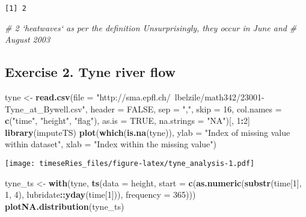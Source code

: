 \documentclass[]{book}
\newenvironment{Shaded}{\begin{snugshade}}{\end{snugshade}}
\newcommand{\KeywordTok}[1]{\textcolor[rgb]{0.13,0.29,0.53}{\textbf{#1}}}
\newcommand{\DataTypeTok}[1]{\textcolor[rgb]{0.13,0.29,0.53}{#1}}
\newcommand{\DecValTok}[1]{\textcolor[rgb]{0.00,0.00,0.81}{#1}}
\newcommand{\StringTok}[1]{\textcolor[rgb]{0.31,0.60,0.02}{#1}}
\newcommand{\CommentTok}[1]{\textcolor[rgb]{0.56,0.35,0.01}{\textit{#1}}}
\newcommand{\OtherTok}[1]{\textcolor[rgb]{0.56,0.35,0.01}{#1}}
\newcommand{\OperatorTok}[1]{\textcolor[rgb]{0.81,0.36,0.00}{\textbf{#1}}}
\newcommand{\NormalTok}[1]{#1}
\begin{document}
\begin{verbatim}
[1] 2
\end{verbatim}

\begin{Shaded}
\begin{Highlighting}[]
\CommentTok{# 2 `heatwaves` as per the definition Unsurprisingly, they occur in June and}
\CommentTok{# August 2003}
\end{Highlighting}
\end{Shaded}

\subsection{Exercise 2. Tyne river
flow}\label{exercise-2.-tyne-river-flow-1}

\begin{Shaded}
\begin{Highlighting}[]
\NormalTok{tyne <-}\StringTok{ }\KeywordTok{read.csv}\NormalTok{(}\DataTypeTok{file =} \StringTok{"http://sma.epfl.ch/~lbelzile/math342/23001-Tyne_at_Bywell.csv"}\NormalTok{, }
    \DataTypeTok{header =} \OtherTok{FALSE}\NormalTok{, }\DataTypeTok{sep =} \StringTok{","}\NormalTok{, }\DataTypeTok{skip =} \DecValTok{16}\NormalTok{, }\DataTypeTok{col.names =} \KeywordTok{c}\NormalTok{(}\StringTok{"time"}\NormalTok{, }\StringTok{"height"}\NormalTok{, }\StringTok{"flag"}\NormalTok{), }
    \DataTypeTok{as.is =} \OtherTok{TRUE}\NormalTok{, }\DataTypeTok{na.strings =} \StringTok{"NA"}\NormalTok{)[, }\DecValTok{1}\OperatorTok{:}\DecValTok{2}\NormalTok{]}
\KeywordTok{library}\NormalTok{(imputeTS)}
\KeywordTok{plot}\NormalTok{(}\KeywordTok{which}\NormalTok{(}\KeywordTok{is.na}\NormalTok{(tyne)), }\DataTypeTok{ylab =} \StringTok{"Index of missing value within dataset"}\NormalTok{, }\DataTypeTok{xlab =} \StringTok{"Index within the missing value"}\NormalTok{)}
\end{Highlighting}
\end{Shaded}

\texttt{[image: timeseRies\_files/figure-latex/tyne\_analysis-1.pdf]}

\begin{Shaded}
\begin{Highlighting}[]
\NormalTok{tyne_ts <-}\StringTok{ }\KeywordTok{with}\NormalTok{(tyne, }\KeywordTok{ts}\NormalTok{(}\DataTypeTok{data =}\NormalTok{ height, }\DataTypeTok{start =} \KeywordTok{c}\NormalTok{(}\KeywordTok{as.numeric}\NormalTok{(}\KeywordTok{substr}\NormalTok{(time[}\DecValTok{1}\NormalTok{], }
    \DecValTok{1}\NormalTok{, }\DecValTok{4}\NormalTok{), lubridate}\OperatorTok{::}\KeywordTok{yday}\NormalTok{(time[}\DecValTok{1}\NormalTok{])), }\DataTypeTok{frequency =} \DecValTok{365}\NormalTok{)))}
\KeywordTok{plotNA.distribution}\NormalTok{(tyne_ts)}
\end{Highlighting}
\end{Shaded}
\end{document}
